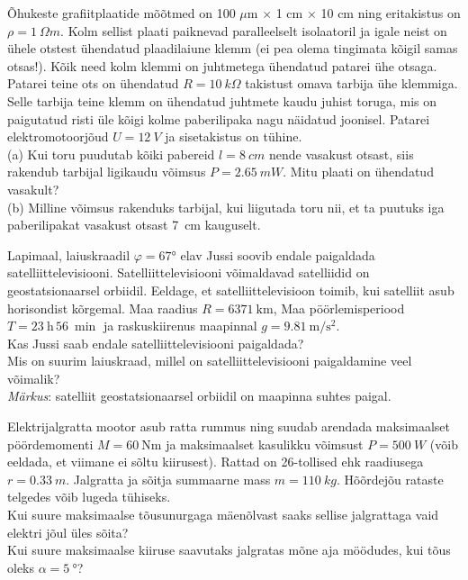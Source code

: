 \documentclass[10pt]{article}
\begin{document}
Õhukeste grafiitplaatide mõõtmed on 100 $\mu$m $\times$ 1 cm $\times$ 10 cm ning eritakistus on $\rho =  \SI{1}{\Omega m}$. Kolm sellist plaati paiknevad paralleelselt isolaatoril ja igale neist on ühele otstest ühendatud plaadilaiune klemm (ei pea olema tingimata kõigil samas otsas!). Kõik need kolm klemmi on juhtmetega ühendatud patarei ühe otsaga. Patarei teine ots on ühendatud $R = \SI{10}{k \Omega}$ takistust omava tarbija ühe klemmiga. Selle tarbija teine klemm on ühendatud juhtmete kaudu juhist toruga, mis on paigutatud risti üle kõigi kolme paberilipaka nagu näidatud joonisel. Patarei elektromotoorjõud $U =\SI{12}{V}$ ja sisetakistus on tühine.
\\(a) Kui toru puudutab kõiki pabereid $l = \SI{8}{cm}$ nende vasakust otsast, siis rakendub tarbijal ligikaudu võimsus $P = \SI{2,65}{mW}$. Mitu plaati on ühendatud vasakult? 
\\(b) Milline võimsus rakenduks tarbijal, kui liigutada toru nii, et ta puutuks iga paberilipakat vasakust otsast \SI{7}{cm} kauguselt.
\probend
\bigskip


Lapimaal, laiuskraadil $\varphi =\ang{67}$ elav Jussi soovib endale paigaldada satelliittelevisiooni. Satelliittelevisiooni võimaldavad satelliidid on geostatsionaarsel orbiidil. Eeldage, et satelliittelevisioon toimib, kui satelliit asub horisondist kõrgemal. Maa raadius $R=\qty{6371}{\km}$, Maa pöörlemisperiood $T=\qty{23}{\hour}\, \qty{56}{\min}$ ja raskuskiirenus maapinnal $g= \qty{9.81}{\m\per\s\squared}$.\\
\osa Kas Jussi saab endale satelliittelevisiooni paigaldada?\\
\osa Mis on suurim laiuskraad, millel on satelliittelevisiooni paigaldamine veel võimalik?
\\ \emph{Märkus}: satelliit geostatsionaarsel orbiidil on maapinna suhtes paigal.
\probend
\bigskip


Elektrijalgratta mootor asub ratta rummus ning suudab arendada maksimaalset pöördemomenti $M=\SI{60}{\newton\meter}$ ja maksimaalset kasulikku võimsust $P=\SI{500}{W}$ (võib eeldada, et viimane ei sõltu kiirusest). Rattad on 26-tollised ehk raadiusega $r=\SI{0.33}{m}$. Jalgratta ja sõitja summaarne mass $m=\SI{110}{kg}$. Hõõrdejõu rataste telgedes võib lugeda tühiseks. \\
\osa Kui suure maksimaalse tõusunurgaga mäenõlvast saaks sellise jalgrattaga vaid elektri jõul üles sõita? \\
\osa Kui suure maksimaalse kiiruse saavutaks jalgratas mõne aja möödudes, kui tõus oleks $\alpha=\SI{5}{\degree}$?
\probend
\bigskip
\end{document}

